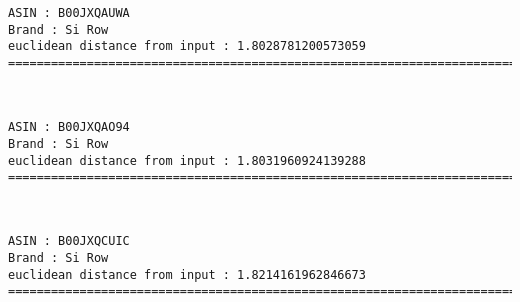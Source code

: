\documentclass[11pt]{article}
\begin{document}
    \begin{Verbatim}[commandchars=\\\{\}]
ASIN : B00JXQAUWA
Brand : Si Row
euclidean distance from input : 1.8028781200573059
=============================================================================================================================

    \end{Verbatim}

    
    
    \begin{center}
    \end{center}
    { \hspace*{\fill} \\}
    
    \begin{Verbatim}[commandchars=\\\{\}]
ASIN : B00JXQAO94
Brand : Si Row
euclidean distance from input : 1.8031960924139288
=============================================================================================================================

    \end{Verbatim}

    
    
    \begin{center}
    \end{center}
    { \hspace*{\fill} \\}
    
    \begin{Verbatim}[commandchars=\\\{\}]
ASIN : B00JXQCUIC
Brand : Si Row
euclidean distance from input : 1.8214161962846673
=============================================================================================================================

    \end{Verbatim}

    
    
    \begin{center}
    \end{center}
    { \hspace*{\fill} \\}
    
\end{document}
